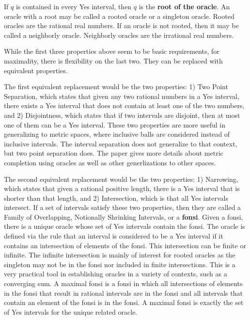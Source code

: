 \documentclass[12pt]{article}
\begin{document}
If $q$ is contained in every Yes interval, then $q$ is the \textbf{root of the oracle}.  An oracle with a root may be called a rooted oracle or a singleton oracle. Rooted oracles are the rational real numbers. If an oracle is not rooted, then it may be called a neighborly oracle. Neighborly oracles are the irrational real numbers. 

While the first three properties above seem to be basic requirements, for maximality, there is flexibility on the last two. They can be replaced with equivalent properties.

The first equivalent replacement would be the two properties: 1) Two Point Separation, which states that given any two rational numbers in a Yes interval, there exists a Yes interval that does not contain at least one of the two numbers, and 2) Disjointness, which states that if two intervals are disjoint, then at most one of them can be a Yes interval. These two properties are more useful in generalizing to metric spaces, where inclusive balls are considered instead of inclusive intervals. The interval separation does not generalize to that context, but two point separation does. The paper \cite{taylor23metric} gives more details about metric completion using oracles as well as other generlizations to other spaces.  

The second equivalent replacement would be the two properties: 1) Narrowing, which states that given a rational positive length, there is a Yes interval that is shorter than that length, and 2) Intersection, which is that all Yes intervals intersect. If a set of intervals satisfy these two properties, then they are called a Family of Overlapping, Notionally Shrinking Intervals, or a \textbf{fonsi}. Given a fonsi, there is a unique oracle whose set of Yes intervals contain the fonsi. The oracle is defined via the rule that an interval is considered to be a Yes interval if it contains an intersection of elements of the fonsi. This intersection can be finite or infinite. The infinite intersection is mainly of interest for rooted oracles as the singleton may not be in the fonsi nor included in finite intersections. This is a very practical tool in establishing oracles in a variety of contexts, such as a converging sum. A maximal fonsi is a fonsi in which all intersections of elements in the fonsi that result in rational intervals are in the fonsi and all intervals that contain an element of the fonsi is in the fonsi. A maximal fonsi is exactly the set of Yes intervals for the unique related oracle. 
\end{document}
